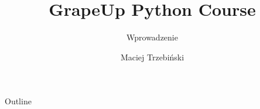 \documentclass[aspectratio=43,english]{beamer}
\title{GrapeUp Python Course}
\subtitle{Wprowadzenie}
\author{Maciej Trzebiński}
\date{}
\begin{document}
    \maketitle

    \begin{frame}{Outline}
        \tableofcontents
    \end{frame}

    

\end{document}

